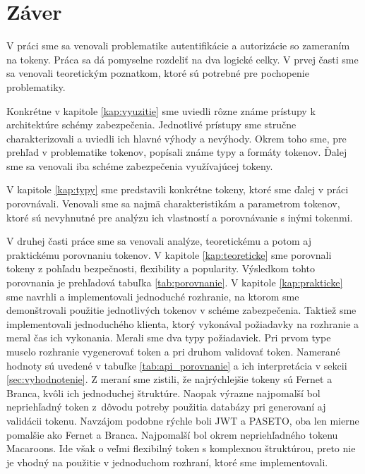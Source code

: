 \chapter*{Záver}  %

V práci sme sa venovali problematike autentifikácie a autorizácie so zameraním na tokeny. Práca sa dá pomyselne rozdeliť na dva logické celky. V prvej časti sme sa venovali teoretickým poznatkom, ktoré sú potrebné pre pochopenie problematiky. 

Konkrétne v kapitole \ref{kap:vyuzitie} sme uviedli rôzne známe prístupy k architektúre schémy zabezpečenia. Jednotlivé prístupy sme stručne charakterizovali a uviedli ich hlavné výhody a nevýhody. Okrem toho sme, pre prehľad v problematike tokenov, popísali známe typy a formáty tokenov. Ďalej sme sa venovali iba schéme zabezpečenia využívajúcej tokeny.

V kapitole \ref{kap:typy} sme predstavili konkrétne tokeny, ktoré sme ďalej v práci porovnávali. Venovali sme sa najmä charakteristikám a parametrom tokenov, ktoré sú nevyhnutné pre analýzu ich vlastností a porovnávanie s inými tokenmi.

V druhej časti práce sme sa venovali analýze, teoretickému a potom aj praktickému porovnaniu tokenov. V kapitole \ref{kap:teoreticke} sme porovnali tokeny z pohľadu bezpečnosti, flexibility a popularity. Výsledkom tohto porovnania je prehľadová tabuľka \ref{tab:porovnanie}. V kapitole \ref{kap:prakticke} sme navrhli a implementovali jednoduché rozhranie, na ktorom sme demonštrovali použitie jednotlivých tokenov v schéme zabezpečenia. Taktiež sme implementovali jednoduchého klienta, ktorý vykonával požiadavky na rozhranie a meral čas ich vykonania. Merali sme dva typy požiadaviek. Pri prvom type muselo rozhranie vygenerovať token a pri druhom validovať token. Namerané hodnoty sú uvedené v tabuľke \ref{tab:api_porovnanie} a ich interpretácia v sekcii \ref{sec:vyhodnotenie}. Z meraní sme zistili, že najrýchlejšie tokeny sú Fernet a Branca, kvôli ich jednoduchej štruktúre. Naopak výrazne najpomalší bol nepriehľadný token z~dôvodu potreby použitia databázy pri generovaní aj validácii tokenu. Navzájom podobne rýchle boli JWT a PASETO, oba len mierne pomalšie ako Fernet a Branca. Najpomalší bol okrem nepriehľadného tokenu Macaroons. Ide však o veľmi flexibilný token s komplexnou štruktúrou, preto nie je vhodný na použitie v jednoduchom rozhraní, ktoré sme implementovali.

